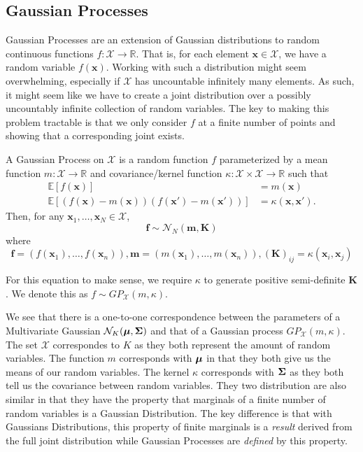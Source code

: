\subsection{Gaussian Processes}

Gaussian Processes are an extension of Gaussian distributions to random continuous functions $f: \mathcal{X} \to \mathbb{R}$.
That is, for each element $\mathbf{x} \in \mathcal{X}$, we have a random variable $f(\mathbf{x})$.
Working with such a distribution might seem overwhelming, especially if $\mathcal{X}$ has uncountable infinitely many elements.
As such, it might seem like we have to create a joint distribution over a possibly uncountably infinite collection of random variables.
The key to making this problem tractable is that we only consider $f$ at a finite number of points and showing that a corresponding joint exists.

\begin{definition}\label{def:gp}
    A Gaussian Process on $\mathcal{X}$ is a random function $f$ parameterized by a mean function
    $m: \mathcal{X} \to \mathbb{R}$ and covariance/kernel function $\kappa: \mathcal{X} \times \mathcal{X} \to \mathbb{R}$
    such that
    \begin{align*}
        \mathbb{E}[f(\mathbf{x})] &= m(\mathbf{x}) \\
        \mathbb{E}[(f(\mathbf{x}) - m(\mathbf{x}))(f(\mathbf{x}') - m(\mathbf{x}'))] &= \kappa(\mathbf{x}, \mathbf{x}').
    \end{align*}
    Then, for any $\mathbf{x}_1, \ldots,\mathbf{x}_N \in \mathcal{X}$,
    \begin{equation*}
        \mathbf{f} \sim \mathcal{N}_N\left(\mathbf{m}, \mathbf{K}\right)
    \end{equation*}
    where
    \begin{equation*}
        \mathbf{f} = (f(\mathbf{x}_1), \ldots, f(\mathbf{x}_n)), \mathbf{m} = (m(\mathbf{x}_1), \ldots, m(\mathbf{x}_n)), (\mathbf{K})_{ij} = \kappa(\mathbf{x}_i, \mathbf{x}_j)
    \end{equation*}
    
    For this equation to make sense, we require $\kappa$ to generate positive semi-definite $\mathbf{K}$.
    We denote this as $f \sim GP_{\mathcal{X}}(m, \kappa)$.
\end{definition}

We see that there is a one-to-one correspondence between the parameters of a Multivariate Gaussian $\mathcal{N}_{K}(\boldsymbol{\mu}, \boldsymbol{\Sigma})$
and that of a Gaussian process $GP_{ \mathcal{X}}(m, \kappa)$.
The set $\mathcal{X}$ correspondes to $K$ as they both represent the amount of random variables.
The function $m$ corresponds with $\boldsymbol{\mu}$ in that they both give us the means of our random variables.
The kernel $\kappa$ corresponds with $\boldsymbol{\Sigma}$ as they both tell us the covariance between random variables.
They two distribution are also similar in that they have the property that marginals of a finite number of random variables is a Gaussian Distribution.
The key difference is that with Gaussians Distributions, this property of finite marginals is a \emph{result} derived from the full joint distribution
while Gaussian Processes are \emph{defined} by this property.

